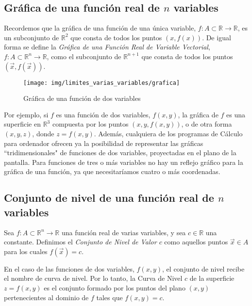 \subsection*{Gráfica de una función real de $n$ variables}

Recordemos que la gráfica de una función de una única variable,
$f: A \subset \mathbb{R}  \to \mathbb{R}$, es un subconjunto de
$\mathbb{R}^2$ que consta de todos los puntos $(x,f(x))$. De igual
forma se define la \emph{Gráfica de una Función Real de Variable
Vectorial}, $f: A \subset \mathbb{R}^n  \to \mathbb{R}$, como el
subconjunto de $\mathbb{R}^{n+1}$ que consta de todos los puntos $
\left( {\vec x ,f\left( {\vec x } \right)} \right)$.

\begin{figure}[h!]
\begin{center}
\texttt{[image: img/limites\_varias\_variables/grafica]}
\caption{Gráfica de una función de dos variables}
\end{center}
\end{figure}


Por ejemplo, si $f$ es una función de dos variables, $f(x,y)$, la
gráfica de $f$ es una superficie en $\mathbb{R}^3$ compuesta por
los puntos $(x,y,f(x,y))$, o de otra forma $(x,y,z)$, donde
$z=f(x,y)$. Además, cualquiera de los programas de Cálculo para
ordenador ofrecen ya la posibilidad de representar las gráficas
``tridimensionales" de funciones de dos variables, proyectadas en
el plano de la pantalla. Para funciones de tres o más variables no
hay un reflejo gráfico para la gráfica de una función, ya que
necesitaríamos cuatro o más coordenadas.




\subsection*{Conjunto de nivel de una función real de $n$
variables}

Sea $f: A \subset \mathbb{R}^n  \to \mathbb{R}$ una función real
de varias variables, y sea $c \in \mathbb{R}$ una constante.
Definimos el \emph{Conjunto de Nivel de Valor $c$} como aquellos
puntos $\vec x  \in A$ para los cuales $f\left( {\vec x } \right)
= c$.

En el caso de las funciones de dos variables, $f(x,y)$, el
conjunto de nivel recibe el nombre de curva de nivel. Por lo
tanto, la Curva de Nivel $c$ de la superficie $z=f(x,y)$ es el
conjunto formado por los puntos del plano $(x,y)$ pertenecientes
al dominio de $f$ tales que  $f(x,y)=c$.

